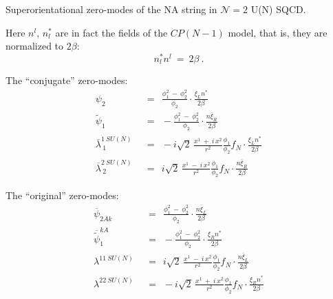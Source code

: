 \documentclass{letter}
\newcommand{\ov}{\overline}
\begin{document}
  Superorientational zero-modes of the NA string in ${\mathcal N}=2$ U(N) SQCD.

  Here $ n^l $, $ n^*_l $ are in fact the fields of the $ CP(N-1) $ model, that is,
they are normalized to $ 2\beta $:
\[
	n^*_l n^l ~=~ 2\beta~.
\]

The ``conjugate'' zero-modes:
\begin{align*}
%
{\psi}_{2} & ~~=~~ \frac{\phi_1^2 ~-~ \phi_2^2}{\phi_2} \cdot \frac{ \xi_L n^*}{2\beta}   \\
%
\tilde{\psi}_{1}  & ~~=~~ - \frac{\phi_1^2 ~-~ \phi_2^2}{\phi_2} \cdot \frac{ n \ov{\xi}_R  } {2\beta} \\
%
\ov{\lambda}^{\dot{1}\ SU(N)}_{\ 1} & ~~=~~ - i \sqrt{2}\, \frac{ x^1 ~+~ i\, x^2 }{r^2} \frac{\phi_1}{\phi_2} f_N \cdot \frac{ \xi_L n^*}{2\beta} \\
%
\ov{\lambda}^{\dot{2}\ SU(N)}_{\ 2} & ~~=~~  i \sqrt{2}\, \frac{ x^1 ~-~ i\, x^2 }{r^2} \frac{\phi_1}{\phi_2} f_N \cdot \frac{ n \ov{\xi}_R} {2\beta} 
\end{align*}


The ``original'' zero-modes:
\begin{align*}
%
\overline{\psi}_{\dot{2}Ak} & ~~=~~ \frac{\phi_1^2 ~-~ \phi_2^2}{\phi_2} \cdot \frac{ n \overline{\xi}_L}{2\beta}   \\
%
\overline{\tilde{\psi}}_{\dot{1}}^{kA}  & ~~=~~ - \frac{\phi_1^2 ~-~ \phi_2^2}{\phi_2} \cdot \frac{ \xi_R n^* } {2\beta} \\
%
\lambda^{11\ SU(N)} & ~~=~~ i \sqrt{2}\, \frac{ x^1 ~-~ i\, x^2 }{r^2} \frac{\phi_1}{\phi_2} f_N \cdot \frac{ n \overline{\xi}_L}{2\beta} \\
%
\lambda^{22\ SU(N)} & ~~=~~ - i \sqrt{2}\, \frac{ x^1 ~+~ i\, x^2 }{r^2} \frac{\phi_1}{\phi_2} f_N \cdot \frac{ \xi_R n^* } {2\beta} \\
\end{align*}
\end{document}
